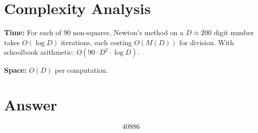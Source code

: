 \documentclass[11pt]{article}
\begin{document}
\section{Complexity Analysis}

\textbf{Time:} For each of 90 non-squares, Newton's method on a $D \approx 200$ digit number takes $O(\log D)$ iterations, each costing $O(M(D))$ for division. With schoolbook arithmetic: $O(90 \cdot D^2 \cdot \log D)$.

\textbf{Space:} $O(D)$ per computation.

\section{Answer}

\[
\boxed{40886}
\]
\end{document}
